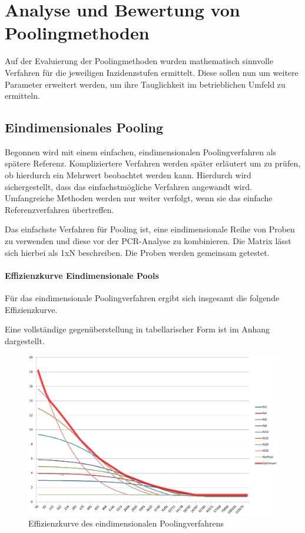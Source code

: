 \chapter{Analyse und Bewertung von Poolingmethoden}
Auf der Evaluierung der Poolingmethoden wurden mathematisch sinnvolle Verfahren für die jeweiligen Inzidenzstufen ermittelt.
Diese sollen nun um weitere Parameter erweitert werden, um ihre Tauglichkeit im betrieblichen Umfeld zu ermitteln.

\section{Eindimensionales Pooling}
Begonnen wird mit einem einfachen, eindimensionalen Poolingverfahren als spätere Referenz.
Kompliziertere Verfahren werden später erläutert um zu prüfen, ob hierdurch ein Mehrwert beobachtet werden kann.
Hierdurch wird sichergestellt, dass das einfachstmögliche Verfahren angewandt wird.
Umfangreiche Methoden werden nur weiter verfolgt, wenn sie das einfache Referenzverfahren übertreffen.

Das einfachste Verfahren für Pooling ist, eine eindimensionale Reihe von Proben zu verwenden und diese vor der PCR-Analyse zu kombinieren.
Die Matrix lässt sich hierbei als 1xN beschreiben.
Die Proben werden gemeinsam getestet.

\subsubsection{Effizienzkurve Eindimensionale Pools}
Für das eindimensionale Poolingverfahren ergibt sich insgesamt die folgende Effizienzkurve.

Eine vollständige gegenüberstellung in tabellarischer Form ist im Anhang dargestellt.
\begin{figure}[h]
	\centering
	\includegraphics[height=.6\textwidth]{img/1D_Pool-EffKurve}
	\caption{Effizienzkurve des eindimensionalen Poolingverfahrens\footnotemark}
\end{figure}

